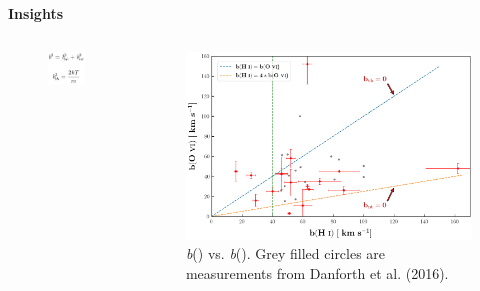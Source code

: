 \documentclass[aspectratio=169]{beamer}
\newcommand\ion[2]{\text{#1\,\textsc{\lowercase{#2}}}}
\begin{document}
\begin{frame}[noframenumbering]{\huge{{\textbf{Insights}}}}

\begin{columns}
  \begin{column}{0.2\textwidth} 
    \vspace*{-8mm}
    \begin{figure}[!htbp]
      \centering
      \includegraphics[width=2.5cm]{Figures/b.png}
    \end{figure}
    
    
  \end{column}      

  \begin{column}{0.8\textwidth}

    \vspace*{-2mm}

    \begin{figure}[!htbp]
      \centering
      \includegraphics[width=9cm]{Figures/bHi_vs_BOvi_danforth.png}
      \vspace*{-1mm}
      \caption{\emph{b}(\ion{O}{vi}) vs. \emph{b}(\ion{H}{i}). Grey filled circles are measurements from Danforth et al. (2016).}
    \end{figure}
  \end{column}

\end{columns}



\end{frame}
\end{document}
